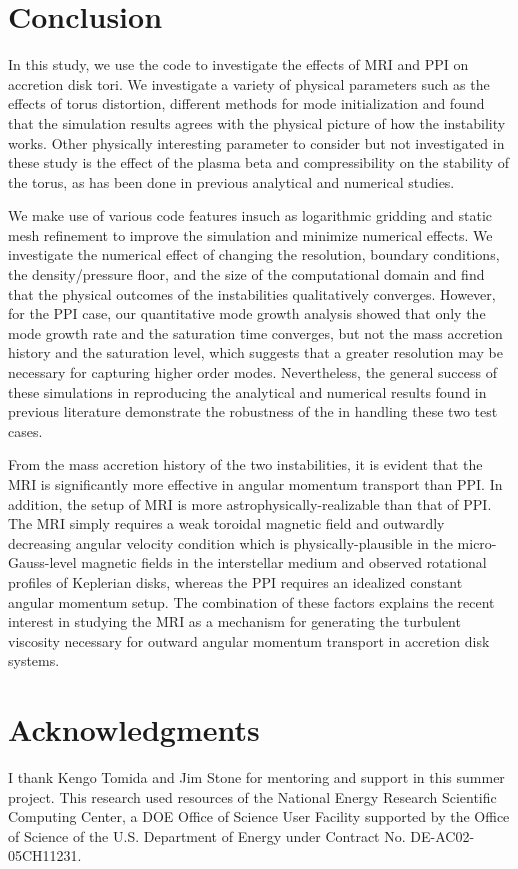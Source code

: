\documentclass[iop,revtex4]{emulateapj}
\begin{document}
\section{Conclusion}
\par In this study, we use the \app code to investigate the effects of \acf{MRI} and \acf{PPI} on accretion disk tori. We investigate a variety of physical parameters such as the effects of torus distortion, different methods for mode initialization and found that the simulation results agrees with the physical picture of how the instability works. Other physically interesting parameter to consider but not investigated in these study is the effect of the plasma beta and compressibility on the stability of the torus, as has been done in previous analytical and numerical studies.
\par We make use of various code features in\app such as logarithmic gridding and static mesh refinement to improve the simulation and minimize numerical effects. We investigate the numerical  effect of changing the resolution, boundary conditions, the density/pressure floor, and the size of the computational domain and find that the physical outcomes of the instabilities qualitatively converges. However, for the \ac{PPI} case, our quantitative mode growth analysis showed that only the mode growth rate and the saturation time converges, but not the mass accretion history and the saturation level, which suggests that a greater resolution may be necessary for capturing higher order modes. Nevertheless, the general success of these simulations in reproducing the analytical and numerical results found in previous literature demonstrate the robustness of the \app in handling these two test cases.
\par  From the mass accretion history of the two instabilities, it is evident that the \ac{MRI} is significantly more effective in angular momentum transport than \ac{PPI}. In addition, the setup of \ac{MRI} is more astrophysically-realizable than that of \ac{PPI}. The \ac{MRI} simply requires a weak toroidal magnetic field and outwardly decreasing angular velocity condition which is physically-plausible in  the micro-Gauss-level magnetic fields in the interstellar medium and observed rotational profiles of Keplerian disks, whereas the \ac{PPI} requires an idealized constant angular momentum setup. The combination of these factors explains the recent interest in studying the \ac{MRI} as a mechanism for generating the turbulent viscosity necessary for outward angular momentum transport in accretion disk systems.
\acknowledgments
\section*{Acknowledgments}
I thank Kengo Tomida and Jim Stone for mentoring and support in this summer project. This research used resources of the National Energy Research Scientific Computing Center, a DOE Office of Science User Facility supported by the Office of Science of the U.S. Department of Energy under Contract No. DE-AC02-05CH11231.

\end{document}

